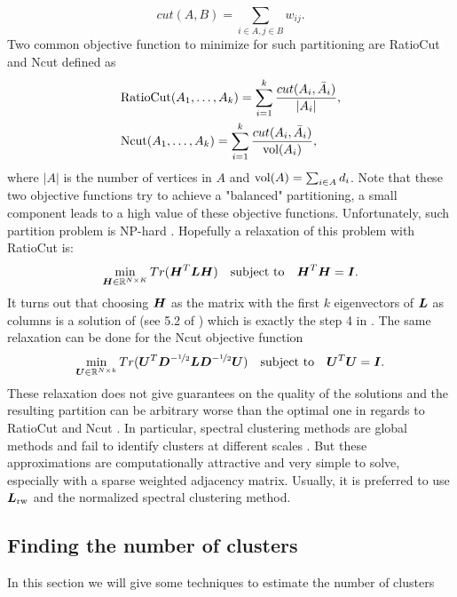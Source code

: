 \begin{equation}
  cut(A,B)=\sum_{i\in A, j\in B} w_{ij}.
\end{equation}
Two common objective function to minimize for such partitioning are RatioCut \citep{Hegen1992} and Ncut \citep{Shi:2000:NCI:351581.351611} defined as 
\begin{align*}
&\textnormal{RatioCut}(A_1,\dots,A_k)=\sum_{i=1}^k\frac{cut(A_i,\bar A_i)}{|A_i|},\\
&\textnormal{Ncut}(A_1,\dots,A_k)=\sum_{i=1}^k\frac{cut(A_i,\bar A_i)}{\textnormal{vol}(A_i)},
\end{align*}
where $|A|$ is the number of vertices in $A$ and $\textnormal{vol}(A) = \sum_{i\in A}d_i$. Note that these two objective functions try to achieve a "balanced" partitioning, a small component leads to a high value of these objective functions. Unfortunately, such partition problem is NP-hard \citep{Wagner1993,Luxburg:2007:TSC:1288822.1288832}. Hopefully a relaxation of this problem with RatioCut is:
\begin{equation}
\label{relaxed_ratiocut_pb}
  \min_{\boldsymbol H\in{{\mathbb R}^{N\times K}}} Tr(\boldsymbol H^T\boldsymbol L\boldsymbol H)\quad \textnormal{subject to}\quad \boldsymbol H^T\boldsymbol H = \boldsymbol I.
\end{equation}
It turns out that choosing $\boldsymbol H$ as the matrix with the first $k$ eigenvectors of $\boldsymbol L$ as columns is a solution of  (see 5.2 of \citep{Luxburg:2007:TSC:1288822.1288832}) which is exactly the step 4 in . The same relaxation can be done for the Ncut objective function
\begin{equation}
  \min_{\boldsymbol U\in{\mathbb R}^{N\times k}} Tr(\boldsymbol U^T\boldsymbol D^{-\nicefrac{1}{2}}\boldsymbol L\boldsymbol D^{-\nicefrac{1}{2}}\boldsymbol U)\quad \textnormal{subject to}\quad \boldsymbol U^T\boldsymbol U = \boldsymbol I.
\end{equation}
These relaxation does not give guarantees on the quality of the solutions and the resulting partition can be arbitrary worse than the optimal one in regards to RatioCut and Ncut \citep{Guattery98,Nadler07fundamentallimitations}. In particular, spectral clustering methods are global methods and fail to identify clusters at different scales \citep{Nadler07fundamentallimitations}. But these approximations are computationally attractive and very simple to solve, especially with a sparse weighted adjacency matrix. Usually, it is preferred to use $\boldsymbol L_{\textnormal{rw}}$ and the normalized spectral clustering method.

\subsection{Finding the number of clusters}
In this section we will give some techniques to estimate the number of clusters


